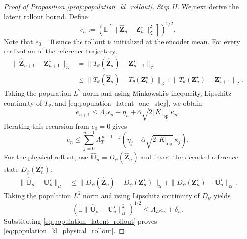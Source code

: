 \documentclass[11pt]{article}
\newcommand{\ol}{\overline}
\begin{document}
\begin{proof}[Proof of Proposition \ref{prop:population_kl_rollout}]
\item\textit{Step II.} We next derive the latent rollout bound. Define
\[
    e_n
    :=
    \left(
        \mathbb E
        \left[
            \|\widehat{\mathbf Z}_n-\mathbf Z_n^\star\|_{\mathcal Z}^2
        \right]
    \right)^{1/2}.
\]
Note that $e_0=0$ since the rollout is initialized at the encoder mean. For every realization of the reference trajectory,
\begin{align*}
    \|\widehat{\mathbf Z}_{n+1}-\mathbf Z_{n+1}^\star\|_{\mathcal Z}
    &=
    \|T_\theta(\widehat{\mathbf Z}_n)-\mathbf Z_{n+1}^\star\|_{\mathcal Z}
    \\
    &\leq
    \|T_\theta(\widehat{\mathbf Z}_n)
      -T_\theta(\mathbf Z_n^\star)\|_{\mathcal Z}
    +
    \|T_\theta(\mathbf Z_n^\star)
      -\mathbf Z_{n+1}^\star\|_{\mathcal Z}.
\end{align*}
Taking the population $L^2$ norm and using Minkowski's inequality, Lipschitz continuity of $T_\theta$, and \eqref{eq:population_latent_one_step}, we obtain
\[
    e_{n+1}
    \leq
    \Lambda_T e_n+\eta_n+\ol{\alpha}\sqrt{2\Vert K\Vert_\mathrm{op}}\,\kappa_n.
\]
Iterating this recursion from $e_0=0$ gives
\begin{equation}
    e_n
    \leq
    \sum_{j=0}^{n-1}
    \Lambda_T^{\,n-1-j}
    \left(\eta_j+\ol{\alpha}\sqrt{2\Vert K\Vert_\mathrm{op}}\,\kappa_j\right).\label{eq:population_latent_rollout}
\end{equation}
For the physical rollout, use $\widehat{\mathbf U}_n=D_\psi(\widehat{\mathbf Z}_n)$ and insert the decoded reference state $D_\psi(\mathbf Z_n^\star)$:
\begin{align*}
    \|\widehat{\mathbf U}_n-\mathbf U_n^\star\|_{\mathcal U}
    &\leq
    \|D_\psi(\widehat{\mathbf Z}_n)
      -D_\psi(\mathbf Z_n^\star)\|_{\mathcal U}
    +
    \|D_\psi(\mathbf Z_n^\star)-\mathbf U_n^\star\|_{\mathcal U}.
\end{align*}
Taking the population $L^2$ norm and using Lipschitz continuity of $D_\psi$ yields
\[
\left(\mathbb E
\|\widehat{\mathbf U}_n-\mathbf U_n^\star\|_{\mathcal U}^2
\right)^{1/2}
\leq\Lambda_D e_n+\delta_n.
\]
Substituting \eqref{eq:population_latent_rollout} proves \eqref{eq:population_kl_physical_rollout}.


\end{proof}
\end{document}
